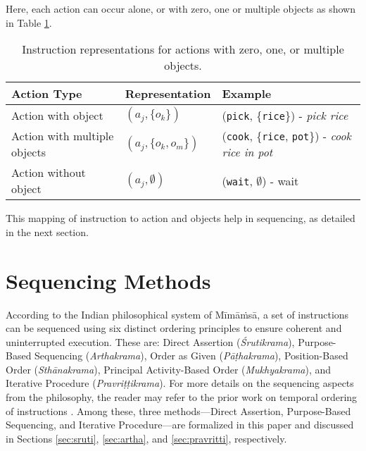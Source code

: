 \documentclass[a4paper,11pt]{lmcs}
\newcommand{\mimamsa}{M\={i}m\={a}\.ms\={a}}
\begin{document}
Here, each action can occur alone, or with zero, one or multiple objects as shown in Table \ref{tab:ac_ob}.
\begin{table}[h!]
\label{tab:ac_ob}
\centering
\begin{tabular}{|l|l|l|}
\hline
\textbf{Action Type}           & \textbf{Representation}             & \textbf{Example}                \\
\hline
Action with object             & $(a_j, \{o_k\})$                    & (\texttt{pick}, \{\texttt{rice}\}) - \textit{pick rice} \\
\hline
Action with multiple objects   & $(a_j, \{o_k, o_m\})$               & (\texttt{cook}, \{\texttt{rice}, \texttt{pot}\}) - \textit{cook rice in pot}\\
\hline
Action without object          & $(a_j, \emptyset)$                  & (\texttt{wait}, $\emptyset$)  - wait  \\
\hline
\end{tabular}
\caption{Instruction representations for actions with zero, one, or multiple objects.}
\end{table}

\medskip
\noindent

This mapping of instruction to action and objects help in sequencing, as detailed in the next section.

\section{Sequencing Methods}
\label{sec:seq}
According to the Indian philosophical system of \mimamsa, a set of instructions can be sequenced using six distinct ordering principles to ensure coherent and uninterrupted execution. These are: Direct Assertion (\textit{Śrutikrama}), Purpose-Based Sequencing (\textit{Arthakrama}), Order as Given (\textit{P\={a}\d{t}hakrama}), Position-Based Order (\textit{Sth\={a}nakrama}), Principal Activity-Based Order (\textit{Mukhyakrama}), and Iterative Procedure (\textit{Pravri\d{t}\d{t}ikrama}). For more details on the sequencing aspects from the philosophy, the reader may refer to the prior work on temporal ordering of instructions \cite{llm_mira}. Among these, three methods—Direct Assertion, Purpose-Based Sequencing, and Iterative Procedure—are formalized in this paper and discussed in Sections \ref{sec:sruti}, \ref{sec:artha}, and \ref{sec:pravritti}, respectively.
\end{document}
